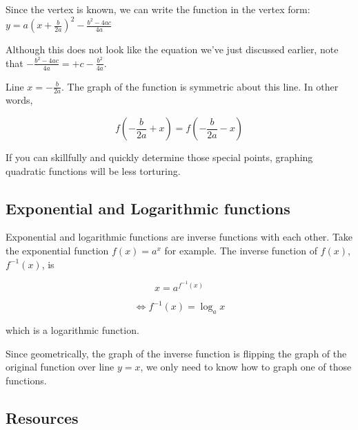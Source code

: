 Since the vertex is known, we can write the function in the vertex form:
$y=a(x+\frac{b}{2a})^2-\frac{b^2-4ac}{4a}$



Although this does not look like the equation we've just discussed earlier, note that
$-\frac{b^2-4ac}{4a}=+c-\frac{b^2}{4a}$.



Line $x=-\frac{b}{2a}$. The graph of the function is symmetric about this line. In other words,



$$f(-\frac{b}{2a}+x)=f(-\frac{b}{2a}-x)$$



If you can skillfully and quickly determine those special points, graphing quadratic
functions will be less torturing.




\subsection{Exponential and Logarithmic functions}
\label{sss:expo-445c}




Exponential and logarithmic functions are inverse functions with each other. Take the
exponential function $f(x)=a^x$ for example. The inverse function of $f(x)$, $f^{-1}(x)$,
is



$$x=a^{f^{-1}(x)}$$



$$\Leftrightarrow f^{-1}(x)=\log _ax$$



which is a logarithmic function.



Since geometrically, the graph of the inverse function is flipping the graph of the
original function over line $y=x$, we only need to know how to graph one of those
functions.




\subsection{Resources}
\label{sss:reso-55b5}





